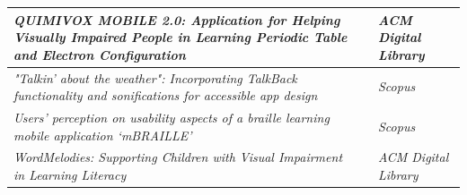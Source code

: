 \begin{quadro}[htb!]
\begin{tabular}{|m{9.5cm} | m{2.7cm} | m{2.5cm}|}
    \emph{QUIMIVOX MOBILE 2.0: Application for Helping Visually Impaired People in Learning Periodic Table and Electron Configuration} & \cite{Oliveira2019} & \emph{ACM Digital Library} \\ \hline
    \emph{"Talkin' about the weather": Incorporating TalkBack functionality and sonifications for accessible app design} & \cite{Tomlinson2016377} & \emph{Scopus} \\ \hline
    \emph{Users’ perception on usability aspects of a braille learning mobile application ‘mBRAILLE’} & \cite{Nahar2019100} & \emph{Scopus} \\ \hline
    \emph{WordMelodies: Supporting Children with Visual Impairment in Learning Literacy} & \cite{Mascetti2019} & \emph{ACM Digital Library} \\ \hline
\end{tabular}
\end{quadro}